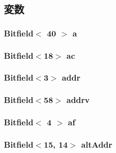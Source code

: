 \subsection{変数}
\hypertarget{namespaceX86ISA_a10d3d5eba86314098a6836272a0215fe}{
\subsubsection[{a}]{\setlength{\rightskip}{0pt plus 5cm}Bitfield$<$ 40 $>$ {\bf a}}}
\label{namespaceX86ISA_a10d3d5eba86314098a6836272a0215fe}
\hypertarget{namespaceX86ISA_a9b4ee74f199ac88ff6c5af0112066e15}{
\subsubsection[{ac}]{\setlength{\rightskip}{0pt plus 5cm}Bitfield$<$18$>$ {\bf ac}}}
\label{namespaceX86ISA_a9b4ee74f199ac88ff6c5af0112066e15}
\hypertarget{namespaceX86ISA_ab705917f60c5566f9ce56a93f798b2e2}{
\subsubsection[{addr}]{\setlength{\rightskip}{0pt plus 5cm}Bitfield$<$3$>$ {\bf addr}}}
\label{namespaceX86ISA_ab705917f60c5566f9ce56a93f798b2e2}
\hypertarget{namespaceX86ISA_a7b2c6fc98433fa3572595b224eca42fe}{
\subsubsection[{addrv}]{\setlength{\rightskip}{0pt plus 5cm}Bitfield$<$58$>$ {\bf addrv}}}
\label{namespaceX86ISA_a7b2c6fc98433fa3572595b224eca42fe}
\hypertarget{namespaceX86ISA_ac1c96b02ad0857356150dc13fbcec627}{
\subsubsection[{af}]{\setlength{\rightskip}{0pt plus 5cm}Bitfield$<$ 4 $>$ {\bf af}}}
\label{namespaceX86ISA_ac1c96b02ad0857356150dc13fbcec627}
\hypertarget{namespaceX86ISA_aaccf902caa5b987fcd9cf699d04caa3a}{
\subsubsection[{altAddr}]{\setlength{\rightskip}{0pt plus 5cm}Bitfield$<$15, 14$>$ {\bf altAddr}}}
